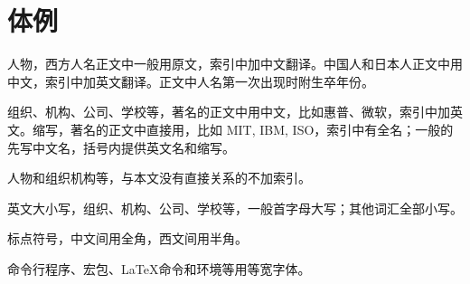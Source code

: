 \section*{体例}

\begin{compactenum}
    \item 人物，西方人名正文中一般用原文，索引中加中文翻译。中国人和日本人正文中用中文，索引中加英文翻译。正文中人名第一次出现时附生卒年份。
    \item 组织、机构、公司、学校等，著名的正文中用中文，比如惠普、微软，索引中加英文。缩写，著名的正文中直接用，比如 MIT, IBM, ISO，索引中有全名；一般的先写中文名，括号内提供英文名和缩写。
    \item 人物和组织机构等，与本文没有直接关系的不加索引。
    \item 英文大小写，组织、机构、公司、学校等，一般首字母大写；其他词汇全部小写。
    \item 标点符号，中文间用全角，西文间用半角。
    \item 命令行程序、宏包、\LaTeX{}命令和环境等用等宽字体。
\end{compactenum}
